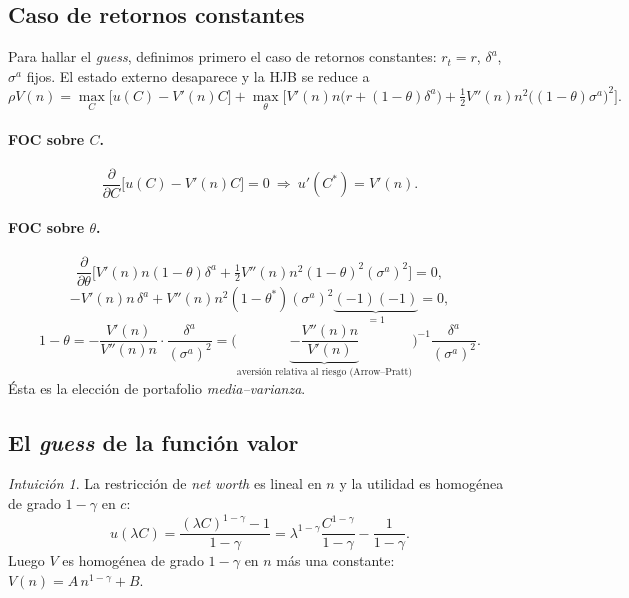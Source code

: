 \documentclass[11pt]{article}
\theoremstyle{definition}
\theoremstyle{remark}
\newtheorem*{intuicion}{Intuición}
\begin{document}
\subsection{Caso de retornos constantes}

Para hallar el \emph{guess}, definimos primero el caso de retornos constantes: $r_t=r$, $\delta^{a}$, $\sigma^{a}$ fijos. El estado externo desaparece y la HJB se reduce a
\begin{equation}
\rho V(n)=\max_C\big[u(C)-V'(n)C\big]
+\max_\theta\Big[V'(n)n\big(r+(1-\theta)\delta^{a}\big)+\tfrac12 V''(n)n^2\big((1-\theta)\sigma^{a}\big)^2\Big].
\end{equation}

\paragraph{FOC sobre $C$.}
\[
\frac{\partial}{\partial C}\big[u(C)-V'(n)C\big]=0\ \Longrightarrow\ u'(C^*)=V'(n).
\]

\paragraph{FOC sobre $\theta$.}
\[
\frac{\partial}{\partial\theta}\Big[V'(n)n(1-\theta)\delta^{a}+\tfrac12 V''(n)n^2(1-\theta)^2(\sigma^{a})^2\Big]=0,
\]
\[
-V'(n)n\,\delta^{a}+V''(n)n^2(1-\theta^*)(\sigma^{a})^2\underbrace{(-1)(-1)}_{=1}=0,
\]
\begin{equation}\label{eq:mvpc}
1-\theta=-\frac{V'(n)}{V''(n)n}\cdot\frac{\delta^{a}}{(\sigma^{a})^2}
=\Big(\underbrace{-\frac{V''(n)n}{V'(n)}}_{\text{aversión relativa al riesgo (Arrow--Pratt)}}\Big)^{-1}\frac{\delta^{a}}{(\sigma^{a})^2}.
\end{equation}
Ésta es la elección de portafolio \emph{media--varianza}.

\subsection{El \emph{guess} de la función valor}

\begin{intuicion}
La restricción de \emph{net worth} es lineal en $n$ y la utilidad es homogénea de grado $1-\gamma$ en $c$:
\[
u(\lambda C)=\frac{(\lambda C)^{1-\gamma}-1}{1-\gamma}=\lambda^{1-\gamma}\frac{C^{1-\gamma}}{1-\gamma}-\frac{1}{1-\gamma}.
\]
Luego $V$ es homogénea de grado $1-\gamma$ en $n$ más una constante: $V(n)=A\,n^{1-\gamma}+B$.
\end{intuicion}
\end{document}
